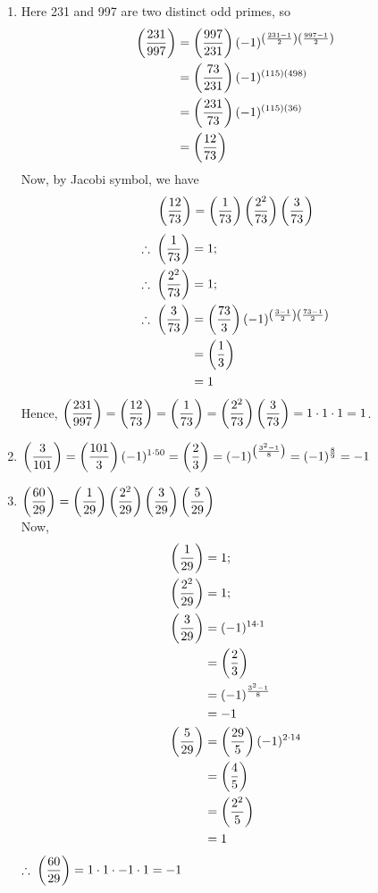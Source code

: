 \documentclass[12pt]{book}
\begin{document}
\begin{soln}
    \hfill
    \begin{enumerate}
        \item Here 231 and 997 are two distinct odd primes, so
        \begin{align*}
            \left( \frac{231}{997} \right)&=\left( \frac{997}{231} \right)(-1)^{\left( \frac{231-1}{2} \right)\left( \frac{997-1}{2} \right)}\\
            &=\left( \frac{73}{231} \right)(-1)^{(115)(498)}\\
            &=\left( \frac{231}{73} \right)(-1)^{(115)(36)}\\
            &=\left( \frac{12}{73} \right)
        \end{align*}
        Now, by Jacobi symbol, we have
        \[\left( \frac{12}{73} \right)=\left( \frac{1}{73} \right)\left( \frac{2^2}{73} \right)\left( \frac{3}{73} \right)\]
        \begin{align*}
            \therefore\;\left( \frac{1}{73} \right)&=1;\\
            \therefore\;\left( \frac{2^2}{73} \right)&=1;\\
            \therefore\;\left( \frac{3}{73} \right)&=\left( \frac{73}{3} \right)(-1)^{\left( \frac{3-1}{2} \right)\left( \frac{73-1}{2} \right)}\\
            &=\left( \frac{1}{3} \right)\\
            &=1
        \end{align*}
        Hence, $ \displaystyle \left( \frac{231}{997} \right)=\left( \frac{12}{73} \right)=\left( \frac{1}{73} \right)=\left( \frac{2^2}{73} \right)\left( \frac{3}{73} \right)=1\cdot1\cdot1=1 $.
        \item $ \displaystyle \left( \frac{3}{101} \right)=\left( \frac{101}{3} \right)(-1)^{1\cdot 50}=\left( \frac{2}{3} \right)=(-1)^{\left( \frac{3^2-1}{8} \right)}=(-1)^{\frac{8}{9}}=-1 $
        \item $ \displaystyle \left( \frac{60}{29} \right)=\left( \frac{1}{29} \right)\left( \frac{2^2}{29} \right)\left( \frac{3}{29} \right)\left( \frac{5}{29} \right) $\\
        Now,
        \begin{align*}
            \left( \frac{1}{29} \right)&=1;\\
            \left( \frac{2^2}{29} \right)&=1;\\
            \left( \frac{3}{29} \right)&=(-1)^{14\cdot1}\\
            &=\left( \frac{2}{3} \right)\\
            &=(-1)^{\frac{3^2-1}{8}}\\
            &=-1\\
            \left( \frac{5}{29} \right)&=\left( \frac{29}{5} \right)(-1)^{2\cdot14}\\
            &=\left( \frac{4}{5} \right)\\
            &=\left( \frac{2^2}{5} \right)\\
            &=1
        \end{align*}
        $ \displaystyle \therefore\;\left( \frac{60}{29} \right)=1\cdot1\cdot-1\cdot1=-1 $

\end{enumerate}
\end{soln}
\end{document}
